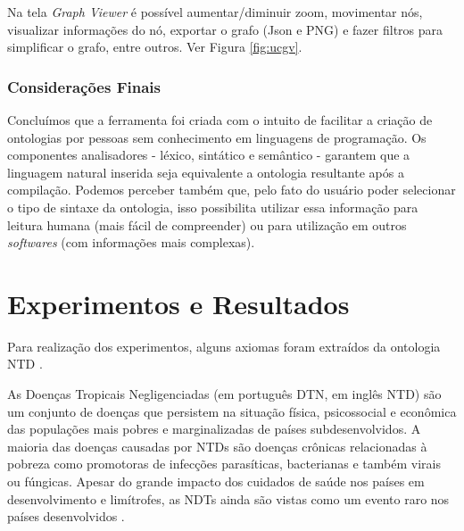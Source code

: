 \documentclass{bcc}
\begin{document}
Na tela \textit{Graph Viewer} é possível aumentar/diminuir zoom, movimentar nós, visualizar informações do nó, exportar o grafo (Json e PNG) e fazer filtros para simplificar o grafo, entre outros. Ver Figura \ref{fig:ucgv}.


\subsection{Considerações Finais}
Concluímos que a ferramenta foi criada com o intuito de facilitar a criação de ontologias por pessoas sem conhecimento em linguagens de programação. Os componentes analisadores - léxico, sintático e semântico - garantem que a linguagem natural inserida seja equivalente a ontologia resultante após a compilação. Podemos perceber também que, pelo fato do usuário poder selecionar o tipo de sintaxe da ontologia, isso possibilita utilizar essa informação para leitura humana (mais fácil de compreender) ou para utilização em outros \textit{softwares} (com informações mais complexas).


\chapter{Experimentos e Resultados}
\label{chap:exp}
Para realização dos experimentos, alguns axiomas foram extraídos da ontologia NTD \cite{ntdo}. %


As Doenças Tropicais Negligenciadas (em português DTN, em inglês NTD) são um conjunto de doenças que persistem na situação física, psicossocial e econômica das populações mais pobres e marginalizadas de países subdesenvolvidos. A maioria das doenças causadas por NTDs são doenças crônicas relacionadas à pobreza como promotoras de infecções parasíticas, bacterianas e também virais ou fúngicas. Apesar do grande impacto dos cuidados de saúde nos países em desenvolvimento e limítrofes, as NDTs ainda são vistas como um evento raro nos países desenvolvidos \cite{ntdo}.
\end{document}
